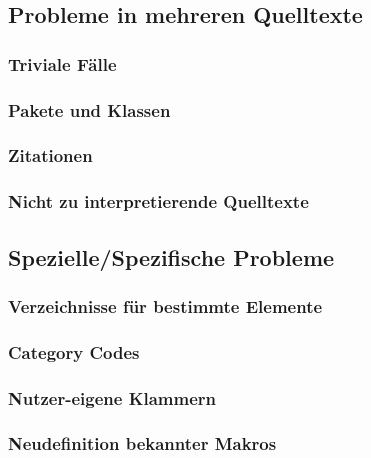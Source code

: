 \subsection{Probleme in mehreren Quelltexte}
\subsubsection{Triviale Fälle}%
\subsubsection{Pakete und Klassen}%
\subsubsection{Zitationen}%
\subsubsection{Nicht zu interpretierende Quelltexte}




\subsection{Spezielle/Spezifische Probleme}
\subsubsection{Verzeichnisse für bestimmte Elemente}%
\subsubsection{Category Codes}
\subsubsection{Nutzer-eigene Klammern}
\subsubsection{Neudefinition bekannter Makros}%
